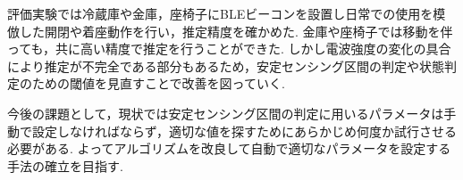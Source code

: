 \documentclass[Japanese]{dicomopapers}
\begin{document}
評価実験では冷蔵庫や金庫，座椅子にBLEビーコンを設置し日常での使用を模倣した開閉や着座動作を行い，推定精度を確かめた.
金庫や座椅子では移動を伴っても，共に高い精度で推定を行うことができた.
しかし電波強度の変化の具合により推定が不完全である部分もあるため，安定センシング区間の判定や状態判定のための閾値を見直すことで改善を図っていく.

今後の課題として，現状では安定センシング区間の判定に用いるパラメータは手動で設定しなければならず，適切な値を探すためにあらかじめ何度か試行させる必要がある.
よってアルゴリズムを改良して自動で適切なパラメータを設定する手法の確立を目指す.


\end{document}
